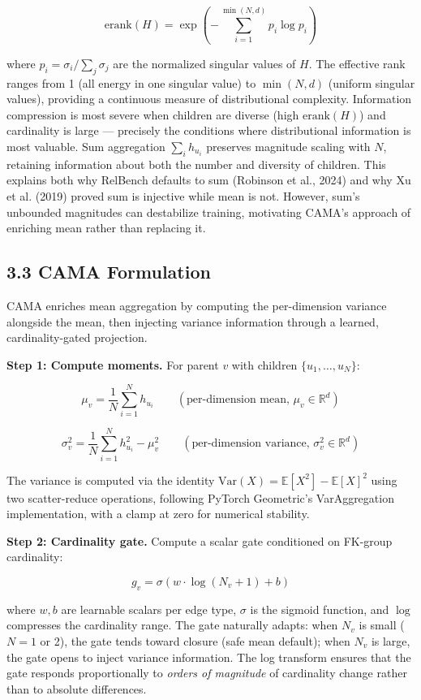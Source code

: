 \documentclass[final]{article}
\begin{document}
$$\text{erank}(H) = \exp\!\left(-\sum_{i=1}^{\min(N,d)} p_i \log p_i\right)$$

where $p_i = \sigma_i / \sum_j \sigma_j$ are the normalized singular values of $H$. The effective rank ranges from 1 (all energy in one singular value) to $\min(N, d)$ (uniform singular values), providing a continuous measure of distributional complexity. Information compression is most severe when children are diverse (high $\text{erank}(H)$) and cardinality is large --- precisely the conditions where distributional information is most valuable. Sum aggregation $\sum_i h_{u_i}$ preserves magnitude scaling with $N$, retaining information about both the number and diversity of children. This explains both why RelBench defaults to sum (Robinson et al., 2024) and why Xu et al. (2019) proved sum is injective while mean is not. However, sum's unbounded magnitudes can destabilize training, motivating CAMA's approach of enriching mean rather than replacing it.

\subsection{3.3 CAMA Formulation}

CAMA enriches mean aggregation by computing the per-dimension variance alongside the mean, then injecting variance information through a learned, cardinality-gated projection.

\textbf{Step 1: Compute moments.} For parent $v$ with children $\{u_1, \ldots, u_N\}$:

$$\mu_v = \frac{1}{N}\sum_{i=1}^{N} h_{u_i} \qquad (\text{per-dimension mean, } \mu_v \in \mathbb{R}^d)$$

$$\sigma_v^2 = \frac{1}{N}\sum_{i=1}^{N} h_{u_i}^2 - \mu_v^2 \qquad (\text{per-dimension variance, } \sigma_v^2 \in \mathbb{R}^d)$$

The variance is computed via the identity $\text{Var}(X) = \mathbb{E}[X^2] - \mathbb{E}[X]^2$ using two scatter-reduce operations, following PyTorch Geometric's VarAggregation implementation, with a clamp at zero for numerical stability.

\textbf{Step 2: Cardinality gate.} Compute a scalar gate conditioned on FK-group cardinality:

$$g_v = \sigma\!\left(w \cdot \log(N_v + 1) + b\right)$$

where $w, b$ are learnable scalars per edge type, $\sigma$ is the sigmoid function, and $\log$ compresses the cardinality range. The gate naturally adapts: when $N_v$ is small ($N{=}1$ or 2), the gate tends toward closure (safe mean default); when $N_v$ is large, the gate opens to inject variance information. The log transform ensures that the gate responds proportionally to \textit{orders of magnitude} of cardinality change rather than to absolute differences.
\end{document}
